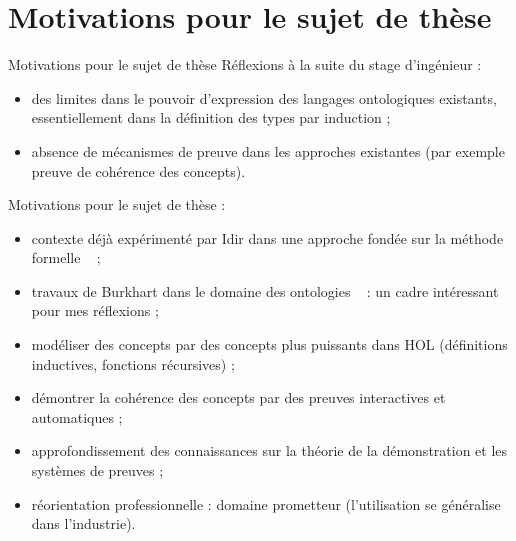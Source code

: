 \documentclass[
  hyperref={
    pdfusetitle,
    pdfencoding=auto,
    psdextra,
    colorlinks=true,
    linkcolor=darkblue,
    citecolor=darkred,
    urlcolor=darkblue,
  },
  9pt,
  aspectratio=169,
]{beamer}
\begin{document}
\section{Motivations pour le sujet de thèse}

\begin{frame}[allowframebreaks]{Motivations pour le sujet de thèse}
  Réflexions à la suite du stage d'ingénieur :
  \begin{itemize}
    \item
      des limites dans le pouvoir d'expression
      des langages ontologiques existants,
      essentiellement dans la définition des types par induction ;
    \item
      absence de mécanismes de preuve dans les approches existantes
      (par exemple preuve de cohérence des concepts).
  \end{itemize}

  \framebreak{}

  Motivations pour le sujet de thèse :
  \begin{itemize}
    \item
      contexte déjà expérimenté par Idir 
      dans une approche fondée sur la méthode formelle %
      ~\cite{DBLP:conf/medi/Ait-SadouneM19} ;
    \item
      travaux de Burkhart 
      dans le domaine des ontologies%
      ~\cites{BruckerWolff.Design-SEFM19}{Brucker-ea.Using-CICM18} :
      un cadre intéressant pour mes réflexions ;
    \item
      modéliser des concepts par des concepts plus puissants dans HOL
     (définitions inductives, fonctions récursives) ;
    \item
      démontrer la cohérence des concepts
      par des preuves interactives et automatiques ;
    \item
      approfondissement des connaissances
      sur la théorie de la démonstration et les systèmes de preuves ;
    \item
      réorientation professionnelle :
      domaine prometteur (l'utilisation se généralise dans l'industrie).
  \end{itemize}

\end{frame}
\end{document}

